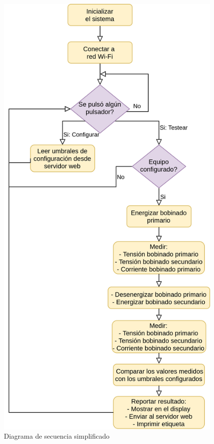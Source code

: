 \begin{figure}[htpb]
\centering 
\includegraphics[width=.8\textwidth]{./Figures/FSMSimplificada.png}
\caption{Diagrama de secuencia simplificado}
\label{fig:FSMSimplificada}
\end{figure}

